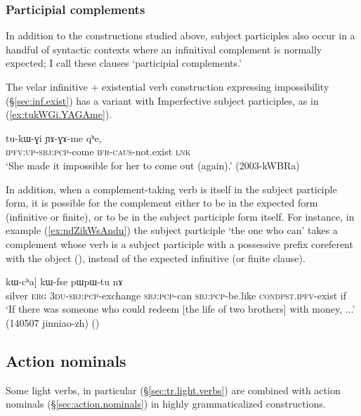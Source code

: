 \subsubsection{Participial complements} \label{sec:participial.complements.negative}
In addition to the constructions studied above, subject participles also occur in a handful of syntactic contexts where an infinitival complement is normally expected; I call these clauses `participial complements.'

The velar infinitive + existential verb construction expressing impossibility (§\ref{sec:inf.exist}) has a variant with Imperfective subject participles, as in (\ref{ex:tukWGi.YAGAme}). 

\begin{exe}
	\ex \label{ex:tukWGi.YAGAme}
	\gll   tu-kɯ-ɣi ɲɤ-ɣɤ-me qʰe,  \\
	\textsc{ipfv}:\textsc{up}-\textsc{sbj}:\textsc{pcp}-come \textsc{ifr}-\textsc{caus}-not.exist \textsc{lnk} \\
	\glt `She made it impossible for her to come out (again).' (2003-kWBRa)
\end{exe}

In addition, when a complement-taking verb is itself in the subject participle form, it is possible for the complement either to be in the expected form (infinitive or finite), or to be in the subject participle form itself. For instance, in example (\ref{ex:ndZikWsAndu}) the subject participle  `the one who can' takes a complement whose verb is a subject participle with a possessive prefix coreferent with the object (), instead of the expected  infinitive (or finite clause).

\begin{exe}
	\ex \label{ex:ndZikWsAndu}
	\gll  [[rŋɯl kɯ ndʑi-kɯ-sɤndu] kɯ-cʰa] kɯ-fse pɯ\redp{}pɯ-tu nɤ  \\
	silver \textsc{erg} \textsc{3du}-\textsc{sbj}:\textsc{pcp}-exchange \textsc{sbj}:\textsc{pcp}-can \textsc{sbj}:\textsc{pcp}-be.like 
	\textsc{cond}\redp{}\textsc{pst}.\textsc{ipfv}-exist if \\
	\glt `If there was someone who could redeem [the life of two brothers] with money, ...' (140507 jinniao-zh)
	()
\end{exe}

\subsection{Action nominals}   \label{sec:complementation.strategy.action.nominals}
Some light verbs, in particular   (§\ref{sec:tr.light.verbs}) are combined with action nominals (§\ref{sec:action.nominals}) in highly grammaticalized constructions.

